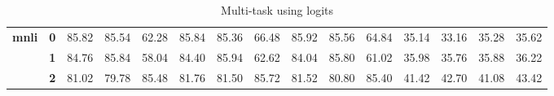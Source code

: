 \begin{table*}
\begin{tabular}{lllllllllllllll}
		\hline
		\multirow{3}{*}{\textbf{mnli}}      & \textbf{0} & 85.82                          & 85.54                          & 62.28                          & 85.84                          & 85.36                          & 66.48                          & 85.92                          & 85.56                          & 64.84                          & 35.14                          & 33.16                          & 35.28                          & 35.62                              \\
		& \textbf{1} & 84.76                          & 85.84                          & 58.04                          & 84.40                          & 85.94                          & 62.62                          & 84.04                          & 85.80                          & 61.02                          & 35.98                          & 35.76                          & 35.88                          & 36.22                              \\
		& \textbf{2} & 81.02                          & 79.78                          & 85.48                          & 81.76                          & 81.50                          & 85.72                          & 81.52                          & 80.80                          & 85.40                          & 41.42                          & 42.70                          & 41.08                          & 43.42                             \\
		\bottomrule
	\end{tabular}
	\caption{Multi-task using logits}\label{tab:multi-use-logits-full}
\end{table*}
